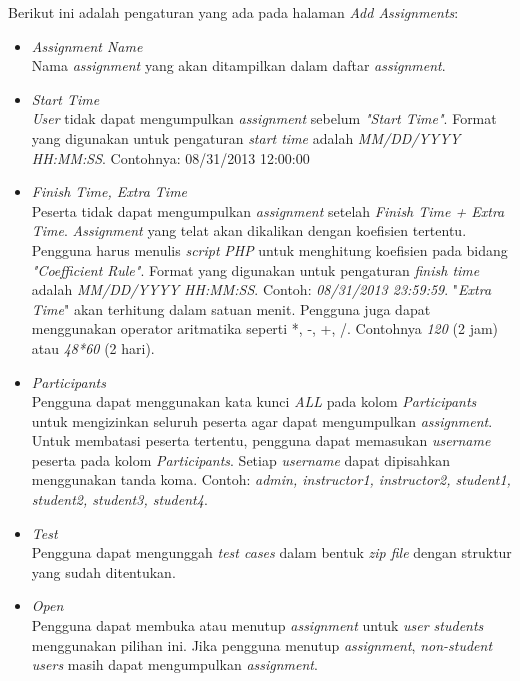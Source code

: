 Berikut ini adalah pengaturan yang ada pada halaman \textit{Add Assignments}:
\begin{itemize}
	\item \textit{Assignment Name} \\
	Nama \textit{assignment} yang akan ditampilkan dalam daftar \textit{assignment}.
	
	\item \textit{Start Time} \\
	\textit{User} tidak dapat mengumpulkan \textit{assignment} sebelum \textit{"Start Time"}. Format yang digunakan untuk pengaturan \textit{start time} adalah \textit{MM/DD/YYYY HH:MM:SS}. Contohnya: 08/31/2013 12:00:00
	
	\item \textit{Finish Time, Extra Time} \\
	Peserta tidak dapat mengumpulkan \textit{assignment} setelah \textit{Finish Time + Extra Time}. \textit{Assignment} yang telat akan dikalikan dengan koefisien tertentu. Pengguna harus menulis \textit{script} \textit{PHP} untuk menghitung koefisien pada bidang \textit{"Coefficient Rule"}. Format yang digunakan untuk pengaturan \textit{finish time} adalah \textit{MM/DD/YYYY HH:MM:SS}. Contoh: \textit{08/31/2013 23:59:59}. "\textit{Extra Time}" akan terhitung dalam satuan menit. Pengguna juga dapat menggunakan operator aritmatika seperti *, -, +, /. Contohnya \textit{120} (2 jam) atau \textit{48*60} (2 hari).
	
	\item \textit{Participants} \\
	Pengguna dapat menggunakan kata kunci \textit{ALL} pada kolom \textit{Participants} untuk mengizinkan seluruh peserta agar dapat mengumpulkan \textit{assignment}. Untuk membatasi peserta tertentu, pengguna dapat memasukan \textit{username} peserta pada kolom \textit{Participants}. Setiap \textit{username} dapat dipisahkan menggunakan tanda koma. Contoh: \textit{admin, instructor1, instructor2, student1, student2, student3, student4}.
	
	\item \textit{Test} \\
	Pengguna dapat mengunggah \textit{test cases} dalam bentuk \textit{zip file} dengan struktur yang sudah ditentukan.
	
	\item \textit{Open} \\
	Pengguna dapat membuka atau menutup \textit{assignment} untuk \textit{user students} menggunakan pilihan ini. Jika pengguna menutup \textit{assignment}, \textit{non-student users} masih dapat mengumpulkan \textit{assignment}.
	

\end{itemize}
